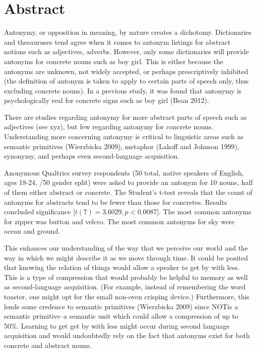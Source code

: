 \clearpage
\section {Abstract}
Antonymy, or opposition in meaning, by nature creates a dichotomy.  Dictionaries and thesauruses tend agree when it comes to antonym listings for abstract notions such as adjectives, adverbs.  However, only some dictionaries will provide antonyms for concrete nouns such as boy \opp girl.  This is either because the antonyms are unknown, not widely accepted, or perhaps prescriptively inhibited (the definition of antonym is taken to apply to certain parts of speech only, thus excluding concrete nouns).  In a previous study, it was found that antonymy is psychologically real for concrete signs such as boy \opp girl (Bean 2012).  

There are studies regarding antonymy for more abstract parts of speech such as adjectives (see xyz), but few regarding antonymy for concrete nouns.  Understanding more concerning antonymy is critical to linguistic areas such as semantic primitives (Wierzbicka 2009), metaphor (Lakoff and Johnson 1999), synonymy, and perhaps even second-language acquisition.  

Anonymous Qualtrics survey respondents (50 total, native speakers of English, ages 18-24, /50 gender split) were asked to provide an antonym for 10 nouns, half of them either abstract or concrete.  The Student’s t-test reveals that the count of antonyms for abstracts tend to be fewer than those for concretes.  Results concluded significance [$t(7) = 3.6029, p < 0.0087$].  The most common antonyms for zipper was button and velcro.  The most common antonyms for sky were ocean and ground\footnotemark.

This enhances our understanding of the way that we perceive our world and the way in which we might describe it as we move through time.  It could be posited that knowing the relation of things would allow a speaker to get by with less. This is a type of compression that would probably be helpful to memory as well as second-language acquisition.  (For example, instead of remembering the word toaster, one might opt for the small non-oven crisping device\footnotemark.)  Furthermore, this lends some credence to semantic primitives (Wierzbicka 2009) since NOT\footnotemark is a semantic primitive--a semantic unit which could allow a compression of up to 50\%.  Learning to get get by with less might occur during second language acquisition and would undoubtedly rely on the fact that antonyms exist for both concrete and abstract nouns.

